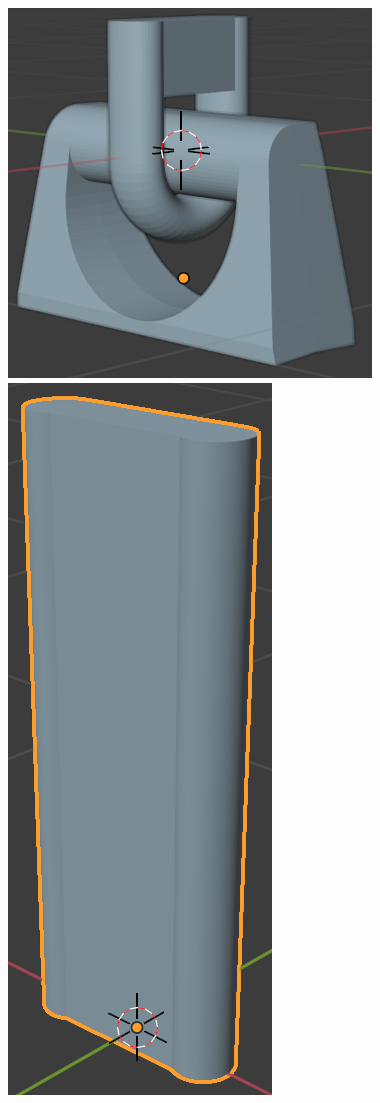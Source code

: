\documentclass{article}
\begin{document}
\includegraphics[scale=0.3]{knob.png}
\includegraphics[scale=0.3]{rod.png}
\end{document}
